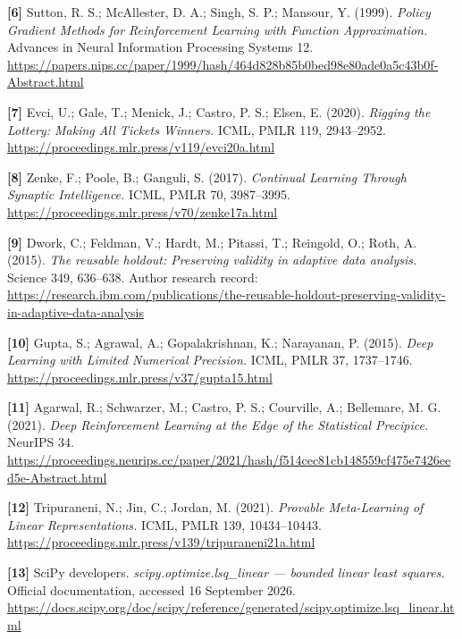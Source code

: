 \documentclass[
  11pt,
  a4paper,
]{article}
\begin{document}
\textbf{{[}6{]}} Sutton, R. S.; McAllester, D. A.; Singh, S. P.;
Mansour, Y. (1999). \emph{Policy Gradient Methods for Reinforcement
Learning with Function Approximation.} Advances in Neural Information
Processing Systems 12.
\url{https://papers.nips.cc/paper/1999/hash/464d828b85b0bed98e80ade0a5c43b0f-Abstract.html}

\textbf{{[}7{]}} Evci, U.; Gale, T.; Menick, J.; Castro, P. S.; Elsen,
E. (2020). \emph{Rigging the Lottery: Making All Tickets Winners.} ICML,
PMLR 119, 2943--2952.
\url{https://proceedings.mlr.press/v119/evci20a.html}

\textbf{{[}8{]}} Zenke, F.; Poole, B.; Ganguli, S. (2017).
\emph{Continual Learning Through Synaptic Intelligence.} ICML, PMLR 70,
3987--3995. \url{https://proceedings.mlr.press/v70/zenke17a.html}

\textbf{{[}9{]}} Dwork, C.; Feldman, V.; Hardt, M.; Pitassi, T.;
Reingold, O.; Roth, A. (2015). \emph{The reusable holdout: Preserving
validity in adaptive data analysis.} Science 349, 636--638. Author
research record:
\url{https://research.ibm.com/publications/the-reusable-holdout-preserving-validity-in-adaptive-data-analysis}

\textbf{{[}10{]}} Gupta, S.; Agrawal, A.; Gopalakrishnan, K.; Narayanan,
P. (2015). \emph{Deep Learning with Limited Numerical Precision.} ICML,
PMLR 37, 1737--1746.
\url{https://proceedings.mlr.press/v37/gupta15.html}

\textbf{{[}11{]}} Agarwal, R.; Schwarzer, M.; Castro, P. S.; Courville,
A.; Bellemare, M. G. (2021). \emph{Deep Reinforcement Learning at the
Edge of the Statistical Precipice.} NeurIPS 34.
\url{https://proceedings.neurips.cc/paper/2021/hash/f514cec81cb148559cf475e7426eed5e-Abstract.html}

\textbf{{[}12{]}} Tripuraneni, N.; Jin, C.; Jordan, M. (2021).
\emph{Provable Meta-Learning of Linear Representations.} ICML, PMLR 139,
10434--10443.
\url{https://proceedings.mlr.press/v139/tripuraneni21a.html}

\textbf{{[}13{]}} SciPy developers. \emph{scipy.optimize.lsq\_linear ---
bounded linear least squares.} Official documentation, accessed 16
September 2026.
\url{https://docs.scipy.org/doc/scipy/reference/generated/scipy.optimize.lsq_linear.html}
\end{document}
